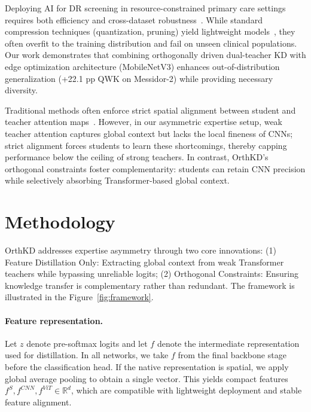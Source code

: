 \documentclass{article}
\begin{document}
Deploying AI for DR screening in resource-constrained primary care settings requires both efficiency and cross-dataset robustness~\cite{cleland2023artificial,zhou2021review}. While standard compression techniques (quantization, pruning) yield lightweight models~\cite{howard2017mobilenets,han2015deep}, they often overfit to the training distribution and fail on unseen clinical populations. Our work demonstrates that combining orthogonally driven dual-teacher KD with edge optimization architecture (MobileNetV3) enhances out-of-distribution generalization (+22.1 pp QWK on Messidor-2) while providing necessary diversity.

Traditional methods often enforce strict spatial alignment between student and teacher attention maps~\cite{zagoruyko2016paying}. However, in our asymmetric expertise setup, weak teacher attention captures global context but lacks the local fineness of CNNs; strict alignment forces students to learn these shortcomings, thereby capping performance below the ceiling of strong teachers. In contrast, OrthKD's orthogonal constraints foster complementarity: students can retain CNN precision while selectively absorbing Transformer-based global context.

\section{Methodology}

OrthKD addresses expertise asymmetry through two core innovations: (1) Feature Distillation Only: Extracting global context from weak Transformer teachers while bypassing unreliable logits; (2) Orthogonal Constraints: Ensuring knowledge transfer is complementary rather than redundant. The framework is illustrated in the Figure~\ref{fig:framework}.

\paragraph{Feature representation.}
Let $z$ denote pre-softmax logits and let $f$ denote the intermediate representation used for distillation. In all networks, we take $f$ from the final backbone stage before the classification head. If the native representation is spatial, we apply global average pooling to obtain a single vector. This yields compact features $f^S, f^{CNN}, f^{ViT} \in \mathbb{R}^{d}$, which are compatible with lightweight deployment and stable feature alignment.
\end{document}
